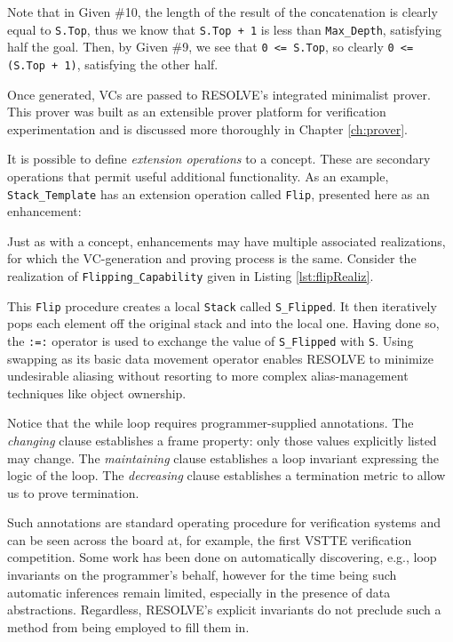 

Note that in Given \#10, the length of the result of the concatenation is clearly equal to \texttt{S.Top}, thus we know that \texttt{S.Top + 1} is less than \texttt{Max\_Depth}, satisfying half the goal.  Then, by Given \#9, we see that \texttt{0 <= S.Top}, so clearly \texttt{0 <= (S.Top + 1)}, satisfying the other half.

Once generated, VCs are passed to RESOLVE's integrated minimalist prover.  This prover was built as an extensible prover platform for verification experimentation\cite{smith10} and is discussed more thoroughly in Chapter \ref{ch:prover}.

It is possible to define \emph{extension operations} to a concept.  These are secondary operations that permit useful additional functionality.  As an example, \texttt{Stack\_Template} has an extension operation called \texttt{Flip}, presented here as an enhancement:

\mbox{}

Just as with a concept, enhancements may have multiple associated realizations, for which the VC-generation and proving process is the same.  Consider the realization of \texttt{Flipping\_Capability} given in Listing \ref{lst:flipRealiz}.



This \texttt{Flip} procedure creates a local \texttt{Stack} called \texttt{S\_Flipped}.  It then iteratively pops each element off the original stack and into the local one.  Having done so, the \texttt{:=:} operator is used to exchange the value of \texttt{S\_Flipped} with \texttt{S}.  Using swapping as its basic data movement operator enables RESOLVE to minimize undesirable aliasing\cite{harmsSwapping, pike2009traditional} without resorting to more complex alias-management techniques like object ownership\cite{boyapati2003ownership}.

Notice that the while loop requires programmer-supplied annotations.  The \emph{changing} clause establishes a frame property: only those values explicitly listed may change.  The \emph{maintaining} clause establishes a loop invariant expressing the logic of the loop.  The \emph{decreasing} clause establishes a termination metric to allow us to prove termination.

Such annotations are standard operating procedure for verification systems and can be seen across the board at, for example, the first VSTTE verification competition\cite{klebanovVSTTEExperience}.  Some work has been done on automatically discovering, e.g., loop invariants on the programmer's behalf\cite{ernstInfer, ernst2007daikon}, however for the time being such automatic inferences remain limited, especially in the presence of data abstractions.  Regardless, RESOLVE's explicit invariants do not preclude such a method from being employed to fill them in.

